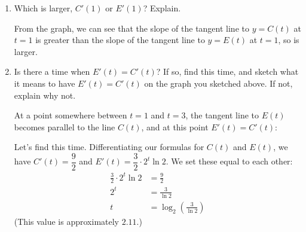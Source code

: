 \documentclass{article}
\theoremstyle{theorem}
\begin{document}
\begin{enumerate}
\begin{enumerate}
  \item
    \begin{problem}[\vfill]
      Which is larger, $C'(1)$ or $E'(1)$? Explain.
    \end{problem}

    \begin{solution}
      From the graph, we can see that the slope of the tangent line to $y = C(t)$ at $t = 1$ is greater than the slope of the tangent line to $y = E(t)$ at $t = 1$, so  is larger. 
    \end{solution}

  \item

    \begin{problem}[\nstretch{2}]
      Is there a time when $E'(t)=C'(t)$? If so, find this time, and sketch what it means to have $E'(t) = C'(t)$ on the graph you sketched above. If not, explain why not. 
    \end{problem}

    \begin{solution}
      At a point somewhere between $t=1$ and $t=3$, the tangent line to $E(t)$ becomes parallel to the line $C(t)$, and at this point $E'(t)=C'(t)$:
      \begin{center} 
      \end{center}
      Let's find this time. Differentiating our formulas for $C(t)$ and $E(t)$, we have $C'(t) = \dfrac{9}{2}$ and $E'(t) = \dfrac{3}{2} \cdot 2^t \ln 2$. We set these equal to each other:
      \begin{align*}
        \frac{3}{2} \cdot 2^t \ln 2 &= \frac{9}{2} \\
        2^t &= \frac{3}{\ln 2} \\
        t &= \boxed{\log_2 \left( \frac{3}{\ln 2} \right)}
      \end{align*}
      (This value is approximately $2.11$.)
    \end{solution}


\end{enumerate}
\end{enumerate}
\end{document}
